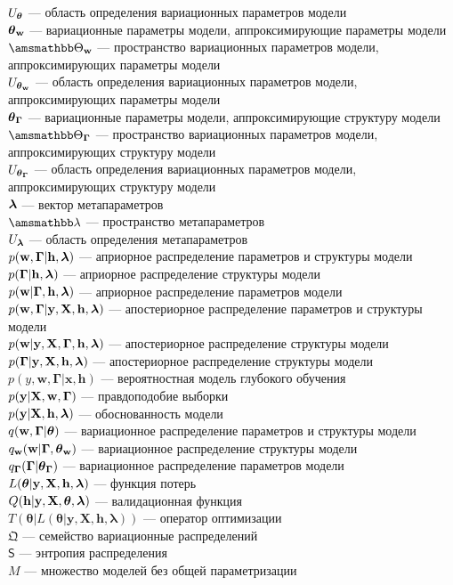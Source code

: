 $\Uteta$ --- область определения вариационных параметров модели\\
$\tetaw$ --- вариационные параметры модели, аппроксимирующие параметры модели\\
$\Tetawb$ --- пространство вариационных параметров модели, аппроксимирующих параметры модели\\
$\Utetaw$ --- область определения вариационных параметров модели, аппроксимирующих параметры модели\\
$\tetaG$ --- вариационные параметры модели, аппроксимирующие структуру модели\\
$\TetaGb$ --- пространство вариационных параметров модели, аппроксимирующих структуру модели\\
$\UtetaG$ --- область определения вариационных параметров модели, аппроксимирующих структуру модели\\
$\lam$ --- вектор метапараметров\\
$\Lamb$ --- пространство метапараметров\\
$\Ulam$ --- область определения  метапараметров\\
$\prior$ --- априорное распределение параметров и структуры модели\\
$\priorG$ --- априорное распределение структуры модели\\
$\priorw$ --- априорное распределение  параметров модели\\
$\post$ --- апостериорное распределение параметров и структуры модели\\
$\postw$ --- апостериорное распределение структуры модели\\
$\postG$ --- апостериорное распределение  структуры модели\\
$p({y}, \mathbf{w},  \boldsymbol{\Gamma}|\mathbf{x}, \mathbf{h})$ --- вероятностная модель глубокого обучения\\
$\LL$ --- правдоподобие выборки\\
$\EV$ --- обоснованность модели\\
$\q$ --- вариационное распределение параметров и структуры модели\\
$\qw$ --- вариационное распределение структуры модели\\
$\qG$ --- вариационное распределение параметров модели\\
$\Loss$ --- функция потерь\\
$\Val$ --- валидационная функция\\
$T(\boldsymbol{\theta} |L(\boldsymbol{\theta} |\mathbf{y},\mathbf{X},\mathbf{h},\boldsymbol{\lambda}))$ --- оператор оптимизации\\
$\mathfrak{Q}$ --- семейство вариационные распределений\\
$\mathsf{S}$ --- энтропия распределения\\
$M$ --- множество моделей без общей параметризации\\
